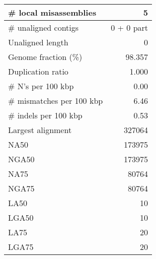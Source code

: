 \documentclass[12pt,a4paper]{article}
\begin{document}
\begin{table}[ht]
\begin{center}
\begin{tabular}{|l*{1}{|r}|}
\# local misassemblies & 5 \\ \hline
\# unaligned contigs & 0 + 0 part \\ \hline
Unaligned length & 0 \\ \hline
Genome fraction (\%) & 98.357 \\ \hline
Duplication ratio & 1.000 \\ \hline
\# N's per 100 kbp & 0.00 \\ \hline
\# mismatches per 100 kbp & 6.46 \\ \hline
\# indels per 100 kbp & 0.53 \\ \hline
Largest alignment & 327064 \\ \hline
NA50 & 173975 \\ \hline
NGA50 & 173975 \\ \hline
NA75 & 80764 \\ \hline
NGA75 & 80764 \\ \hline
LA50 & 10 \\ \hline
LGA50 & 10 \\ \hline
LA75 & 20 \\ \hline
LGA75 & 20 \\ \hline
\end{tabular}
\end{center}
\end{table}
\end{document}
